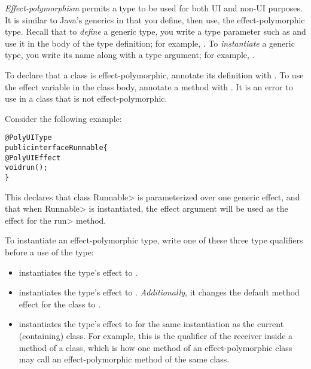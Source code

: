 \emph{Effect-polymorphism} permits a type to be used for both UI and non-UI
purposes.  It is similar to Java's generics in that you define, then use, the
effect-polymorphic type.
Recall that to \emph{define} a generic type, you write a type parameter such as
 and use it in the body of the type definition; for example,
 .
To \emph{instantiate} a generic type, you write its name along with a type
argument; for example, .



To declare that a class is effect-polymorphic, annotate its definition with
.
To use the effect variable in the class body, annotate a method with .
It is an error to use  in a class that is not
effect-polymorphic.


Consider the following example:

\begin{alltt}
@PolyUIType
public interface Runnable \{
    @PolyUIEffect
    void run();
\}
\end{alltt}

\noindent
This declares that class \<Runnable> is parameterized over one
generic effect, and that when \<Runnable> is instantiated, the effect
argument will be used as the effect for the \<run> method.



To instantiate an effect-polymorphic type, write one of these three type
qualifiers before a use of the type:
\begin{itemize}
\item
  instantiates the type's effect to .
\item
  instantiates the type's effect to .
  \emph{Additionally}, it changes the
  default method effect for the class to .
\item
   instantiates the type's
  effect to  for the same instantiation as the current
  (containing) class.  For example, this is the qualifier of the receiver
   inside a method of a  class, which is how
  one method of an effect-polymorphic class may call an effect-polymorphic
  method of the same class.
\end{itemize}

